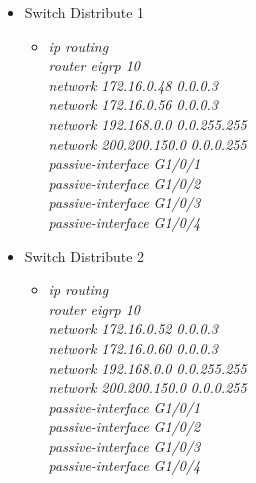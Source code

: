 \documentclass[12pt,a4paper]{report}
\begin{document}
\begin{itemize}
\begin{itemize}
\begin{itemize}
          \end{itemize}
             \item Switch Distribute 1
        \begin{itemize}
         \item \textit{ip routing\\
router eigrp 10\\
network 172.16.0.48 0.0.0.3\\
network 172.16.0.56 0.0.0.3\\
network 192.168.0.0 0.0.255.255\\
network 200.200.150.0 0.0.0.255\\
passive-interface G1/0/1\\
passive-interface G1/0/2\\
passive-interface G1/0/3\\
passive-interface G1/0/4\\}
         
          \end{itemize}
             \item Switch Distribute 2
        \begin{itemize}
         \item \textit{ip routing\\
router eigrp 10\\
network 172.16.0.52 0.0.0.3\\
network 172.16.0.60 0.0.0.3\\
network 192.168.0.0 0.0.255.255\\
network 200.200.150.0 0.0.0.255\\
passive-interface G1/0/1\\
passive-interface G1/0/2\\
passive-interface G1/0/3\\
passive-interface G1/0/4\\}
         
          \end{itemize}
       \end{itemize}
     

\end{itemize}
\end{document}
